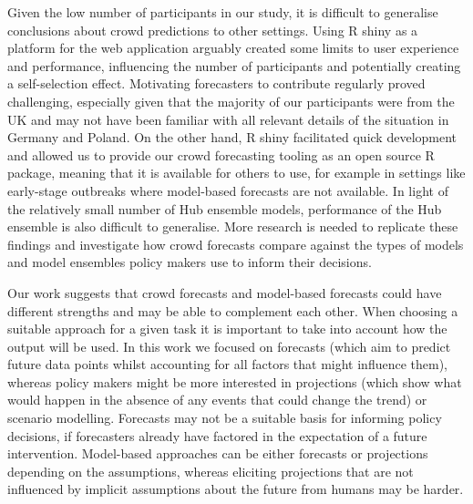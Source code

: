 \documentclass[10pt,letterpaper]{article}
\begin{document}
Given the low number of participants in our study, it is difficult to
generalise conclusions about crowd predictions to other settings. Using
R shiny as a platform for the web application arguably created some
limits to user experience and performance, influencing the number of
participants and potentially creating a self-selection effect.
Motivating forecasters to contribute regularly proved challenging,
especially given that the majority of our participants were from the UK
and may not have been familiar with all relevant details of the
situation in Germany and Poland. On the other hand, R shiny facilitated
quick development and allowed us to provide our crowd forecasting
tooling as an open source R package, meaning that it is available for
others to use, for example in settings like early-stage outbreaks where
model-based forecasts are not available. In light of the relatively
small number of Hub ensemble models, performance of the Hub ensemble is
also difficult to generalise. More research is needed to replicate these
findings and investigate how crowd forecasts compare against the types
of models and model ensembles policy makers use to inform their
decisions.

Our work suggests that crowd forecasts and model-based forecasts could
have different strengths and may be able to complement each other. When
choosing a suitable approach for a given task it is important to take
into account how the output will be used. In this work we focused on
forecasts (which aim to predict future data points whilst accounting for
all factors that might influence them), whereas policy makers might be
more interested in projections (which show what would happen in the
absence of any events that could change the trend) or scenario
modelling. Forecasts may not be a suitable basis for informing policy
decisions, if forecasters already have factored in the expectation of a
future intervention. Model-based approaches can be either forecasts or
projections depending on the assumptions, whereas eliciting projections
that are not influenced by implicit assumptions about the future from
humans may be harder.
\end{document}
